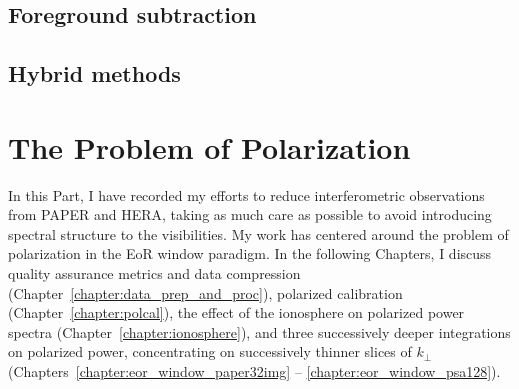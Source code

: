 \subsection{Foreground subtraction}

\subsection{Hybrid methods}

\section{The Problem of Polarization}


In this Part, I have recorded my efforts to reduce interferometric observations from PAPER and HERA, taking as much care as possible to avoid introducing spectral structure to the visibilities. My work has centered around the problem of polarization in the EoR window paradigm. In the following Chapters, I discuss quality assurance metrics and data compression (Chapter~\ref{chapter:data_prep_and_proc}), polarized calibration (Chapter~\ref{chapter:polcal}), the effect of the ionosphere on polarized power spectra (Chapter~\ref{chapter:ionosphere}), and three successively deeper integrations on polarized power, concentrating on successively thinner slices of $k_{\perp}$ (Chapters~\ref{chapter:eor_window_paper32img} -- \ref{chapter:eor_window_psa128}).
